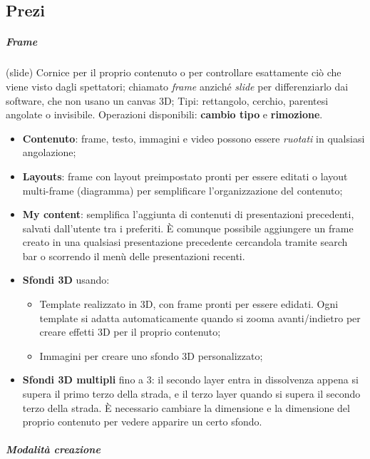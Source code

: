 \subsection{Prezi}
\subparagraph{Frame} (slide)
Cornice per il proprio contenuto o per controllare esattamente ciò che viene visto dagli spettatori;
chiamato \emph{frame} anziché \emph{slide} per differenziarlo dai software, che non usano un canvas 3D;
Tipi: rettangolo, cerchio, parentesi angolate o invisibile.
Operazioni disponibili: \textbf{cambio tipo} e \textbf{rimozione}.
\begin{itemize}
  \item \textbf{Contenuto}: frame, testo, immagini e video possono essere \emph{ruotati} in qualsiasi angolazione;
  \item \textbf{Layouts}: frame con layout preimpostato pronti per essere editati o layout multi-frame (diagramma) per semplificare l'organizzazione del contenuto;
  \item \textbf{My content}: semplifica l'aggiunta di contenuti di presentazioni precedenti, salvati dall'utente tra i preferiti.
  \`E comunque possibile aggiungere un frame creato in una qualsiasi presentazione precedente cercandola tramite search bar o scorrendo il menù delle presentazioni recenti.
  \item \textbf{Sfondi 3D} usando:
  \begin{itemize}
   \item Template realizzato in 3D, con frame pronti per essere edidati. Ogni template si adatta automaticamente quando si zooma avanti/indietro per creare effetti
   3D per il proprio contenuto;
   \item Immagini per creare uno sfondo 3D personalizzato;
  \end{itemize}
  \item \textbf{Sfondi 3D multipli} fino a 3: il secondo layer entra in dissolvenza appena si supera il primo terzo della strada, 
  e il terzo layer quando si supera il secondo terzo della strada. \`E necessario cambiare la dimensione e la dimensione del proprio contenuto per vedere
  apparire un certo sfondo.
\end{itemize}
\subparagraph{Modalità creazione}

